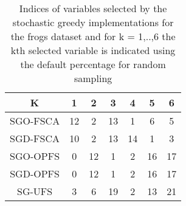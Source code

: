 \begin{table}
	\begin{center}
		\begin{tabular}{c c c c c c c}
			K & 1 & 2 & 3 & 4 & 5 & 6 \\
			\hline
			SGO-FSCA & 12 & 2 & 13 & 1 & 6 & 5 \\
			SGD-FSCA & 10 & 2 & 13 & 14 & 1 & 3 \\
			SGO-OPFS & 0 & 12 & 1 & 2 & 16 & 17 \\
			SGD-OPFS & 0 & 12 & 1 & 2 & 16 & 17 \\
			SG-UFS & 3 & 6 & 19 & 2 & 13 & 21 \\
		\end{tabular}
	\end{center}
	\caption{Indices of variables selected by the stochastic greedy implementations for the frogs dataset and for k = 1,..,6 the kth selected variable is indicated using the default percentage for random sampling}
\end{table}